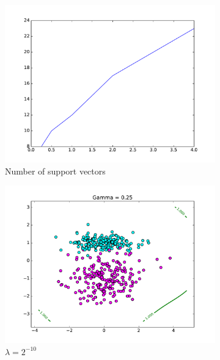 \documentclass[10pt,psamsfonts]{amsart}
\theoremstyle{definition}
\theoremstyle{remark}
\numberwithin{equation}{section}
\begin{document}
\begin{figure}[b]
	\centering
	\begin{subfigure}[b]{0.23\textwidth}
		\includegraphics[width=\textwidth]{hw2_3-4_sv.pdf}
		\caption{Number of support vectors}
	\end{subfigure}
	\begin{subfigure}[b]{0.23\textwidth}
		\includegraphics[width=\textwidth]{hw2_3-4_0.pdf}
		\caption{$\lambda = 2^{-10}$}
	\end{subfigure}
	\begin{subfigure}[b]{0.23\textwidth}

\end{subfigure}
\end{figure}
\end{document}
